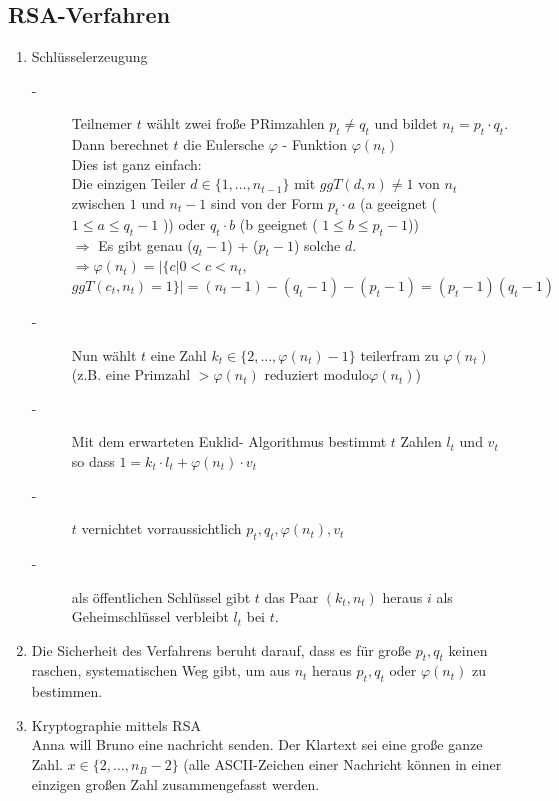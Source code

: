 \subsection{RSA-Verfahren}
\begin{enumerate}
	\item Schlüsselerzeugung
	\begin{description}
		\item[-] Teilnemer $t$ wählt zwei froße PRimzahlen $p_{t} \neq q_{t}$ und bildet $n_{t} = p_{t} \cdot q_{t}$. 					Dann berechnet $t$ die Eulersche $\varphi$ - Funktion $\varphi (n_{t})$\\
				Dies ist ganz einfach:\\
				Die einzigen Teiler $d \in \{1, \dotsc, n_{t-1}\}$ mit $ggT(d,n) \neq 1$ von $n_{t}$ zwischen $1$ 					und $n_{t}-1$ sind von der Form $p_{t} \cdot a$ (a geeignet ( $1 \leq a \leq q_{t} - 1$ )) oder 					$q_{t} \cdot b$ (b geeignet ( $1 \leq b \leq p_{t} - 1$))\\
				$\Rightarrow$ Es gibt genau ($q_{t} - 1$) + ($p_{t} - 1$) solche $d$.\\
				$\Rightarrow \varphi(n_{t}) = |\{ c | 0 <  c < n_{t},$ $ggT(c_{t},n_{t}) = 1\}| = (n_{t} - 1) - 					(q_{t} - 1) - (p_{t} - 1) = (p_{t} - 1)(q_{t} - 1)$
		\item[-] Nun wählt $t$ eine Zahl $k_{t} \in \{2, \dotsc, \varphi(n_{t}) -1\}$ teilerfram zu $\varphi(n_{t})$ (z.B. 					eine Primzahl $> \varphi(n_{t})$ reduziert modulo$\varphi(n_{t})$)
		\item[-] Mit dem erwarteten Euklid- Algorithmus bestimmt $t$ Zahlen $l_{t}$ und $v_{t}$ so dass $1 = k_{t} 					\cdot l_{t} + \varphi(n_{t}) \cdot v_{t}$
		\item[-] $t$ vernichtet vorraussichtlich $p_{t}, q_{t}, \varphi(n_{t}), v_{t}$ 
		\item[-] als öffentlichen Schlüssel gibt $t$ das Paar $(k_{t},n_{t})$ heraus $i$ als Geheimschlüssel verbleibt $l_{t}$ bei $t$. 
	\end{description}
	\item Die Sicherheit des Verfahrens beruht darauf, dass es für große $p_{t}, q_{t}$ keinen raschen, systematischen 			Weg gibt, um aus $n_{t}$ heraus $p_{t}, q_{t}$ oder $\varphi(n_{t})$ zu bestimmen.
	\item Kryptographie mittels RSA\\
		Anna will Bruno eine nachricht senden. Der Klartext sei eine große ganze Zahl. $x \in \{2, \dotsc, n_{B}-2\}$ (alle 
		ASCII-Zeichen einer Nachricht können in einer einzigen großen Zahl zusammengefasst werden.

\end{enumerate}
